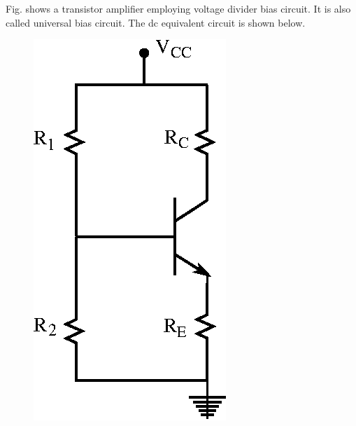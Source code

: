Fig. shows a transistor amplifier employing voltage divider bias circuit. It is also called universal bias circuit. The dc equivalent circuit is shown below.
\begin{figure}[H]
\centering
\includegraphics{chap3/fig3.21.eps}
\end{figure}

\eject

